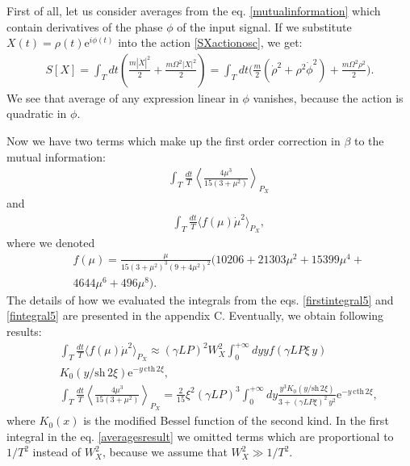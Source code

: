 \documentclass{article}
\begin{document}
First of all, let us consider averages from the eq. \eqref{mutualinformation} which contain derivatives of the phase $\phi$ of the input signal. If we substitute $X(t) = \rho(t) \textrm{e}^{i\phi(t)}$ into the action \eqref{SXactionosc}, we get: 
\begin{eqnarray}
    S[X] = \int_{T} dt \left(\frac{m |\dot{X}|^{2}}{2}+\frac{m\Omega^{2}|X|^{2}}{2}\right) = \int_{T} dt \Bigg(\frac{m}{2}(\dot{\rho}^{2}+\rho^{2}\dot{\phi}^{2})+\frac{m\Omega^{2} \rho^{2}}{2}\Bigg).
\end{eqnarray}
We see that average of any expression linear in $\phi$ vanishes, because the action is quadratic in $\phi$.

Now we have two terms which make up the first order correction in $\beta$ to the mutual information: 
\begin{eqnarray}\label{firstintegral5}
    &&\int_{T} \frac{dt}{T}\left\langle \frac{4 \mu^{3}}{15(3+\mu^{2})} \right\rangle_{P_{X}}
\end{eqnarray}
and
\begin{eqnarray}\label{fintegral5}
    &&\int_{T} \frac{dt}{T} \langle f(\mu) \dot{\mu}^{2} \rangle_{P_{X}},
\end{eqnarray}
where we denoted
\begin{eqnarray}
    && f(\mu) = \frac{\mu}{15(3+\mu^{2})^{3}(9+4\mu^{2})^{2}}(10206 + 21303\mu^{2}+15399\mu^{4}+\\\nonumber
    &&4644\mu^{6}+496\mu^{8}). \nonumber
\end{eqnarray}
The details of how we evaluated the integrals from the eqs. \eqref{firstintegral5} and \eqref{fintegral5} are presented in the appendix C. Eventually, we obtain following results: 
\begin{eqnarray}\label{averagesresult}
    &&\int_{T} \frac{dt}{T}\langle f(\mu)\dot{\mu}^{2} \rangle_{P_{X}} \approx (\gamma L P )^{2} W_{X}^{2}\int_{0}^{+\infty}dy y f\left(\gamma L P\xi\,  y\right)\\ \nonumber
    &&K_{0}\left(y/\textrm{sh}\,2\xi\right)\textrm{e}^{-y\, \textrm{cth}\,2\xi}, \\ \nonumber
    &&  \int_{T} \frac{dt}{T}\left\langle \frac{4 \mu^{3}}{15(3+\mu^{2})} \right\rangle_{P_{X}} = \frac{2}{15}\xi^{2}(\gamma L P)^{3}\int_{0}^{+\infty}dy \frac{y^{3}K_{0}\left(y/\textrm{sh}\,2\xi\right)}{3+(\gamma L P\xi)^{2}\,y^{2}}\textrm{e}^{-y\,\textrm{cth}\, 2\xi},
\end{eqnarray}
where $K_{0}(x)$ is the modified Bessel function of the second kind. In the first integral in the eq. \eqref{averagesresult} we omitted terms which are proportional to $1/T^{2}$ instead of $W_{X}^{2}$, because we assume that $W_{X}^{2}\gg1/T^{2}$.
\end{document}
